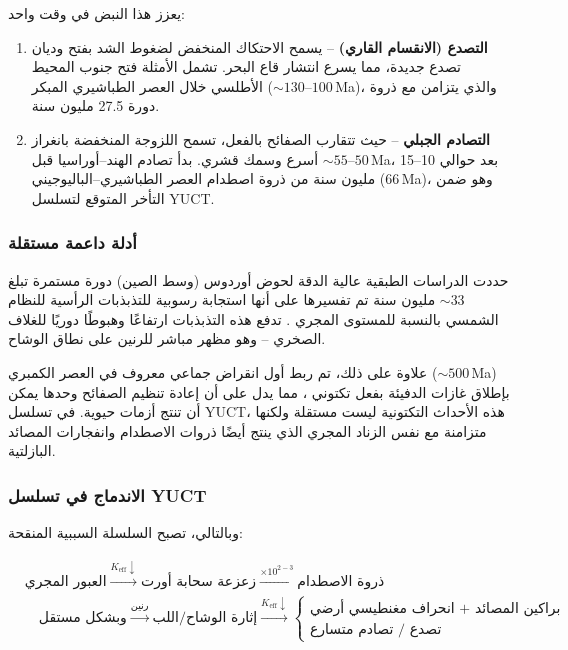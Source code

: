 \documentclass[11pt,a4paper]{article}
\begin{document}
	يعزز هذا النبض في وقت واحد:
	
	\begin{enumerate}
		\item \textbf{التصدع (الانقسام القاري)} – يسمح الاحتكاك المنخفض لضغوط الشد بفتح وديان تصدع جديدة، مما يسرع انتشار قاع البحر.  
		تشمل الأمثلة فتح جنوب المحيط الأطلسي خلال العصر الطباشيري المبكر (\(\sim 130\)–\(100\) Ma)، والذي يتزامن مع ذروة دورة 27.5 مليون سنة.
		\item \textbf{التصادم الجبلي} – حيث تتقارب الصفائح بالفعل، تسمح اللزوجة المنخفضة بانغراز أسرع وسمك قشري.  
		بدأ تصادم الهند–أوراسيا قبل \(\sim 55\)–\(50\) Ma، بعد حوالي 10–15 مليون سنة من ذروة اصطدام العصر الطباشيري–الباليوجيني (66 Ma)، وهو ضمن التأخر المتوقع لتسلسل YUCT.
	\end{enumerate}
	
	\subsubsection{أدلة داعمة مستقلة}
	
	حددت الدراسات الطبقية عالية الدقة لحوض أوردوس (وسط الصين) دورة مستمرة تبلغ \(\sim 33\) مليون سنة تم تفسيرها على أنها استجابة رسوبية للتذبذبات الرأسية للنظام الشمسي بالنسبة للمستوى المجري \cite{Rampino2021}.  
	تدفع هذه التذبذبات ارتفاعًا وهبوطًا دوريًا للغلاف الصخري – وهو مظهر مباشر للرنين على نطاق الوشاح.
	
	علاوة على ذلك، تم ربط أول انقراض جماعي معروف في العصر الكمبري (\(\sim 500\) Ma) بإطلاق غازات الدفيئة بفعل تكتوني \cite{Jablonski1991}، مما يدل على أن إعادة تنظيم الصفائح وحدها يمكن أن تنتج أزمات حيوية.  في تسلسل YUCT، هذه الأحداث التكتونية ليست مستقلة ولكنها متزامنة مع نفس الزناد المجري الذي ينتج أيضًا ذروات الاصطدام وانفجارات المصائد البازلتية.
	
	\subsubsection{الاندماج في تسلسل YUCT}
	
	وبالتالي، تصبح السلسلة السببية المنقحة:
	
	\begin{center}
		\begin{minipage}{0.9\textwidth}
			\small
			\[
			\begin{aligned}
				&\text{العبور المجري} \xrightarrow{K_{\mathrm{eff}}\downarrow} \text{زعزعة سحابة أورت} \xrightarrow{\times 10^{2-3}} \text{ذروة الاصطدام}\\
				&\quad \text{وبشكل مستقل} \xrightarrow{\text{رنين}} \text{إثارة الوشاح/اللب} \xrightarrow{K_{\mathrm{eff}}\downarrow} 
				\begin{cases}
					\text{براكين المصائد + انحراف مغنطيسي أرضي}\\
					\text{تصدع / تصادم متسارع}
				\end{cases}
			\end{aligned}
			\]
		\end{minipage}
	\end{center}
	
\end{document}
